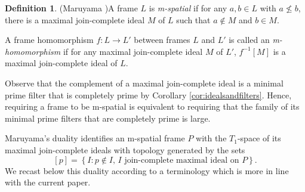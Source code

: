 \documentclass{article}
\theoremstyle{plain}
\newtheorem{fact}[theorem]{Fact}
\theoremstyle{definition}
\newtheorem{definition}[theorem]{Definition}
\theoremstyle{remark}
\newcommand{\bp}[1]{\left\lbrace #1 \right\rbrace}
\newcommand{\0}{\mathbbm 0}
\newcommand{\1}{\mathbbm 1}
\newcommand{\2}{\mathbbm 2}
\begin{document}
%
%
%


\begin{definition}(Maruyama \cite[Def. 2.2]{maruyama})\label{def:m-spatial}
A frame \( L \) is \emph{m-spatial} if for any \( a, b \in L \) with \( a \not\leq b \), there is a maximal
join-complete ideal \( M \) of \( L \) such that \( a \notin M \) and \( b\in M \).
%
%


\label{def:m-homomorphism}
A frame homomorphism \( f : L \to L' \) between frames \( L \) and \( L' \) is called an \emph{m-homomorphism}
if for any maximal join-complete ideal \( M \) of \( L' \), \( f^{-1}[M] \) is a maximal join-complete ideal of \( L \).
\end{definition}



Observe that the complement of a maximal join-complete ideal is a minimal prime filter that is completely prime by Corollary \ref{cor:idealsandfilters}. Hence, requiring a frame to be m-spatial is equivalent to requiring that the family of its minimal prime filters that are completely prime is large. 

Maruyama's duality identifies an m-spatial frame $P$ with the $T_1$-space of its maximal join-complete ideals with topology generated by the sets 
\[
[p]=\bp{I: p\not\in I,\, I\text{ join-complete maximal ideal on } P}.
\] 
We recast below this duality according to a terminology which is more in line with the current paper.
\end{document}
